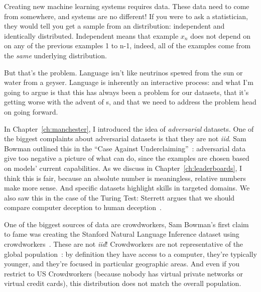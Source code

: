 Creating new machine learning systems requires data.  These data need to come
from somewhere, and  systems are no different!  If you were to ask a
statistician, they would tell you get a sample from an \iid{} distribution:
independent and identically distributed.  Independent means that example
$x_{n}$ does not depend on on any of the previous examples 1 to n-1, indeed,
all of the examples come from the \emph{same} underlying distribution.

But that’s the problem.  Language isn’t like neutrinos spewed from the sun or
water from a geyser.  Language is inherently an interactive process: and what
I’m going to argue is that this has always been a problem for our 
datasets, that it’s getting worse with the advent of s, and that
we need to address the problem head on going forward.

In Chapter~\ref{ch:manchester}, I introduced the idea of
\emph{adversarial} datasets.
%
One of the biggest complaints about adversarial datasets is that they
are not \textit{iid}.
%
Sam Bowman outlined this in the ``Case Against
Underclaiming''~\citep{bowman-22-underclaiming}: adversarial data give too negative a picture
of what  can do, since the examples are chosen based on
models' current capabilities.
%
As we discuss in Chapter~\ref{ch:leaderboards}, I think this is fair,
because an absolute number is meaningless, relative numbers make more
sense.  And specific datasets highlight skills in targeted domains.
%
We also saw this in the case of the Turing Test: Sterrett argues that
we should compare computer deception to human deception~\citep{Sterrett-00}.

One of the biggest sources of  data are crowdworkers, Sam
Bowman's first claim to fame was creating the Stanford Natural
Language Inference dataset using crowdworkers~\citep{bowman-etal-2015-large}.
%
These are not \textit{iid}!
%
Crowdworkers are not representative of the global population~\citep{paolacci-10}:
by definition they have access to a computer, they’re typically
younger, and they’re focused in particular geographic areas.
%
And even if you restrict to US Crowdworkers (because nobody has
virtual private networks or virtual credit cards), this distribution
does not match the overall  population.

